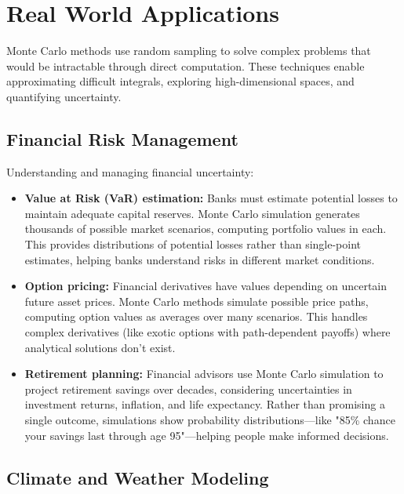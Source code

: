 
\section{Real World Applications}
\label{sec:monte-carlo-real-world}

Monte Carlo methods use random sampling to solve complex problems that would be intractable through direct computation. These techniques enable approximating difficult integrals, exploring high-dimensional spaces, and quantifying uncertainty.

\subsection{Financial Risk Management}

Understanding and managing financial uncertainty:

\begin{itemize}
    \item \textbf{Value at Risk (VaR) estimation:} Banks must estimate potential losses to maintain adequate capital reserves. Monte Carlo simulation generates thousands of possible market scenarios, computing portfolio values in each. This provides distributions of potential losses rather than single-point estimates, helping banks understand risks in different market conditions.
    
    \item \textbf{Option pricing:} Financial derivatives have values depending on uncertain future asset prices. Monte Carlo methods simulate possible price paths, computing option values as averages over many scenarios. This handles complex derivatives (like exotic options with path-dependent payoffs) where analytical solutions don't exist.
    
    \item \textbf{Retirement planning:} Financial advisors use Monte Carlo simulation to project retirement savings over decades, considering uncertainties in investment returns, inflation, and life expectancy. Rather than promising a single outcome, simulations show probability distributions—like "85\% chance your savings last through age 95"—helping people make informed decisions.
\end{itemize}

\subsection{Climate and Weather Modeling}

